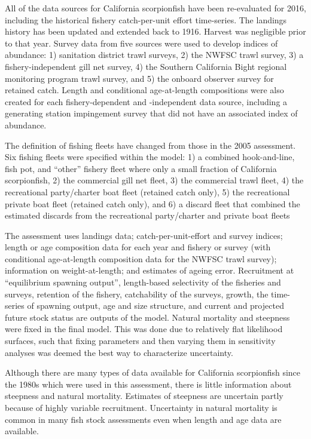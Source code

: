 \documentclass[12pt,]{article}
\begin{document}
All of the data sources for California scorpionfish have been
re-evaluated for 2016, including the historical fishery catch-per-unit
effort time-series. The landings history has been updated and extended
back to 1916. Harvest was negligible prior to that year. Survey data
from five sources were used to develop indices of abundance: 1)
sanitation district trawl surveys, 2) the NWFSC trawl survey, 3) a
fishery-independent gill net survey, 4) the Southern California Bight
regional monitoring program trawl survey, and 5) the onboard observer
survey for retained catch. Length and conditional age-at-length
compositions were also created for each fishery-dependent and
-independent data source, including a generating station impingement
survey that did not have an associated index of abundance.

The definition of fishing fleets have changed from those in the 2005
assessment.\\
Six fishing fleets were specified within the model: 1) a combined
hook-and-line, fish pot, and ``other'' fishery fleet where only a small
fraction of California scorpionfish, 2) the commercial gill net fleet,
3) the commercial trawl fleet, 4) the recreational party/charter boat
fleet (retained catch only), 5) the recreational private boat fleet
(retained catch only), and 6) a discard fleet that combined the
estimated discards from the recreational party/charter and private boat
fleets

The assessment uses landings data; catch-per-unit-effort and survey
indices; length or age composition data for each year and fishery or
survey (with conditional age-at-length composition data for the NWFSC
trawl survey); information on weight-at-length; and estimates of ageing
error. Recruitment at ``equilibrium spawning output'', length-based
selectivity of the fisheries and surveys, retention of the fishery,
catchability of the surveys, growth, the time-series of spawning output,
age and size structure, and current and projected future stock status
are outputs of the model. Natural mortality and steepness were fixed in
the final model. This was done due to relatively flat likelihood
surfaces, such that fixing parameters and then varying them in
sensitivity analyses was deemed the best way to characterize
uncertainty.

Although there are many types of data available for California
scorpionfish since the 1980s which were used in this assessment, there
is little information about steepness and natural mortality. Estimates
of steepness are uncertain partly because of highly variable
recruitment. Uncertainty in natural mortality is common in many fish
stock assessments even when length and age data are available.
\end{document}
